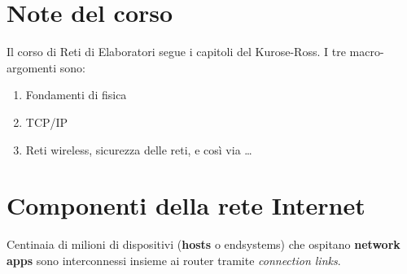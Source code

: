 \section{Note del corso}
Il corso di Reti di Elaboratori segue i capitoli del Kurose-Ross.
I tre macro-argomenti sono:
\begin{enumerate}
  \item Fondamenti di fisica
  \item TCP/IP
  \item Reti wireless, sicurezza delle reti, e così via \ldots
\end{enumerate}

\section{Componenti della rete Internet}
Centinaia di milioni di dispositivi (\textbf{hosts} o endsystems) che ospitano \textbf{network apps} sono interconnessi insieme ai router tramite \textit{connection links}. 

